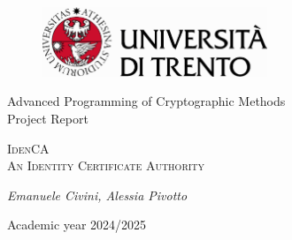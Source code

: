 \pagestyle{plain}
\thispagestyle{empty}

  \vspace*{\fill}

  \begin{center}
  \begin{figure}[h!]
    \centering
    \includegraphics[keepaspectratio, width=0.6\textwidth]{Pic/marchio_unitrento_colore_it_202002.eps}
  \end{figure}

  \vspace{2 cm} 

  \LARGE{Advanced Programming of Cryptographic Methods}\\

  \vspace{1 cm} 
  \Large{Project Report}

  \vspace{2 cm} 

  \Huge\textsc{IdenCA\\ An Identity Certificate Authority}

    \vspace{2 cm} 

  \Large{\it{ Emanuele Civini, Alessia Pivotto }}

  \vspace{2 cm} 

  \Large{Academic year 2024/2025}
  \vspace*{\fill}
\end{center}
